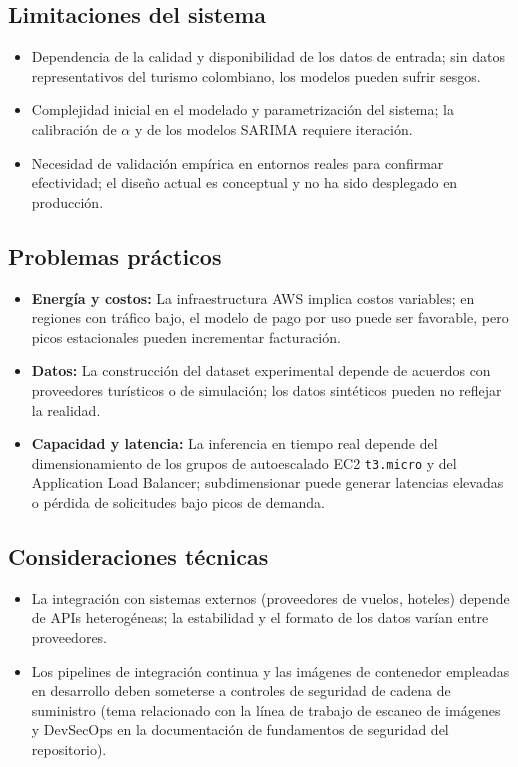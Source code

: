 \documentclass[12pt, letterpaper]{article}
\begin{document}
\subsection{Limitaciones del sistema}

\begin{itemize}
\item Dependencia de la calidad y disponibilidad de los datos de entrada; sin datos representativos del turismo colombiano, los modelos pueden sufrir sesgos.
\item Complejidad inicial en el modelado y parametrización del sistema; la calibración de $\alpha$ y de los modelos SARIMA requiere iteración.
\item Necesidad de validación empírica en entornos reales para confirmar efectividad; el diseño actual es conceptual y no ha sido desplegado en producción.
\end{itemize}

\subsection{Problemas prácticos}

\begin{itemize}
\item \textbf{Energía y costos:} La infraestructura AWS implica costos variables; en regiones con tráfico bajo, el modelo de pago por uso puede ser favorable, pero picos estacionales pueden incrementar facturación.
\item \textbf{Datos:} La construcción del dataset experimental depende de acuerdos con proveedores turísticos o de simulación; los datos sintéticos pueden no reflejar la realidad.
\item \textbf{Capacidad y latencia:} La inferencia en tiempo real depende del dimensionamiento de los grupos de autoescalado EC2 \texttt{t3.micro} y del Application Load Balancer; subdimensionar puede generar latencias elevadas o pérdida de solicitudes bajo picos de demanda.
\end{itemize}

\subsection{Consideraciones técnicas}

\begin{itemize}
\item La integración con sistemas externos (proveedores de vuelos, hoteles) depende de APIs heterogéneas; la estabilidad y el formato de los datos varían entre proveedores.
\item Los pipelines de integración continua y las imágenes de contenedor empleadas en desarrollo deben someterse a controles de seguridad de cadena de suministro (tema relacionado con la línea de trabajo de escaneo de imágenes y DevSecOps en la documentación de fundamentos de seguridad del repositorio).
\end{itemize}
\end{document}
